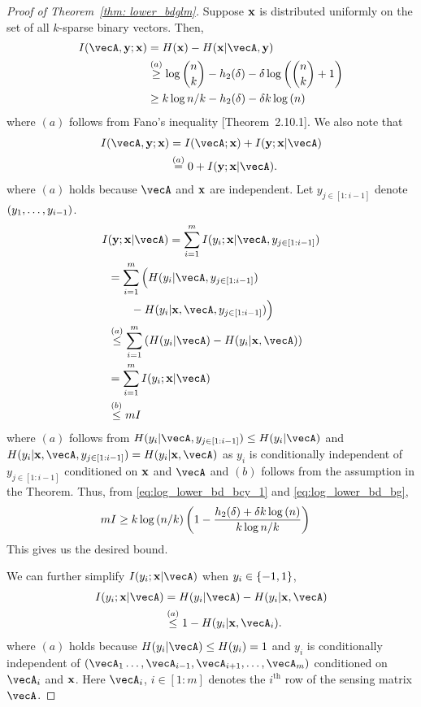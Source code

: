 \begin{proof}[Proof of Theorem~\ref{thm: lower_bdglm}]
Suppose $\mathbf{x}$ is distributed uniformly on the set of all $k$-sparse binary vectors. Then,
\begin{align}
I(\vecA, \by; \bx)  &= H(\bx) - H(\bx|\vecA, \by)\nonumber\\
&\stackrel{(a)}{\geq} \log{n \choose k } - h_2(\delta) - \delta\log\inp{{n \choose k } + 1}\nonumber\\
&\geq k\log{n/k}- h_2(\delta)- \delta k\log\inp{n}\label{eq:log_lower_bd_bcy_1}
\end{align} where $(a)$ follows from Fano's inequality [Theorem~2.10.1]\cite{thomas2006elements}.
We also note that
\begin{align*}
 I(\vecA, \by; \bx) &= I(\vecA ; \bx)    +  I(\by; \bx|\vecA)\\
 &\stackrel{(a)}{ = }0 + I(\by; \bx|\vecA).
\end{align*}where $(a)$ holds because $\vecA$ and $\mathbf{x}$ are independent. Let $y_{j\in[1:i-1]}$ denote $\left(y_1, \ldots, y_{i-1}\right)$. 
\begin{align}
I&(\by; \bx|\vecA) = \sum_{i = 1}^{m}I(y_i; \bx|\vecA, y_{j\in[1:i-1]})\nonumber\\
& = \sum_{i = 1}^{m}\Big(H(y_i|\vecA, y_{j\in[1:i-1]})\nonumber\\
&\qquad- H(y_i| \bx,\vecA, y_{j\in[1:i-1]})\Big)\nonumber\\
& \stackrel{(a)}{\leq}\sum_{i = 1}^{m}\inp{H(y_i|\vecA)- H(y_i| \bx,\vecA)}\nonumber\\
& = \sum_{i = 1}^{m}I(y_i;\bx|\vecA)\nonumber\\
&\stackrel{(b)}{\leq} mI \label{eq:log_lower_bd_bg}
\end{align}where $(a)$ follows from $H(y_i|\vecA, y_{j\in[1:i-1]})\leq H(y_i|\vecA)$ and $H(y_i| \bx,\vecA, y_{j\in[1:i-1]}) = H(y_i| \bx,\vecA)$ as $y_i$ is conditionally independent of $y_{j\in[1:i-1]}$ conditioned on $\mathbf{x}$ and $\vecA$ and $(b)$ follows from the assumption in the Theorem. Thus, from \eqref{eq:log_lower_bd_bcy_1} and \eqref{eq:log_lower_bd_bg},
\begin{align*}
mI &\geq  k\log\left(n/k\right)\left(1-\frac{h_2(\delta)+ \delta k\log\left(n\right)}{k\log{n/k}}\right)
\end{align*}
This gives us the desired bound.

We can further simplify $I(y_i;\bx|\vecA)$ when $y_i\in \left\{-1,1\right\}$, 
\begin{align*}
I(y_i;\bx|\vecA) &= H(y_i|\vecA)- H(y_i|\bx, \vecA)\\
&\stackrel{(a)}{\leq} 1- H(y_i|\bx, \vecA_i).
\end{align*}where $(a)$ holds because $H(y_i|\vecA)\leq H(y_i) =1$ and $y_i$ is conditionally independent of $(\vecA_1\ldots, \vecA_{i-1}, \vecA_{i+1}, \ldots, \vecA_{m})$ conditioned on $\vecA_i$ and $\mathbf{x}$. Here $\vecA_i$, $i\in [1:m]$ denotes the $i^{\text{th}}$ row of the sensing matrix $\vecA$.


\end{proof}
